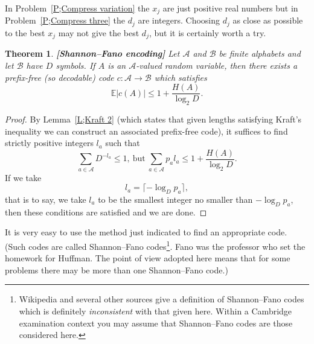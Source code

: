\documentclass[12pt,a4paper]{article}
\theoremstyle{plain}
\newtheorem{theorem}{Theorem}[section]
\theoremstyle{definition}
\begin{document}
In Problem~\ref{P;Compress variation}
the $x_{j}$ are just positive real numbers but in
Problem~\ref{P;Compress three} the $d_{j}$ are integers.
Choosing $d_{j}$ as close as possible to the best $x_{j}$
may not give the best $d_{j}$, but it is certainly worth a try.
\begin{theorem}\label{T;Shannon--Fano}{\bf[Shannon--Fano encoding]} 
Let ${\mathcal A}$ and ${\mathcal B}$
be finite alphabets and let ${\mathcal B}$ have $D$ symbols. If 
$A$ is an ${\mathcal A}$-valued random variable, 
then there exists
a prefix-free (so decodable) code 
$c:{\mathcal A}\rightarrow{\mathcal B}$
which satisfies 
\[{\mathbb E}|c(A)|\leq 1+\frac{H(A)}{\log_{2} D}.\]
\end{theorem}
\begin{proof} By  Lemma~\ref{L;Kraft 2} (which states
that given lengths satisfying
Kraft's inequality we can construct an associated
prefix-free code), it suffices to find strictly
positive integers $l_{a}$ such that
\[\sum_{a\in {\mathcal A}}D^{-l_{a}}\leq 1,
\ \text{but}
\ \sum_{a\in {\mathcal A}}p_{a}l_{a}\leq 1+\frac{H(A)}{\log_{2} D}.\]
If we take
\[l_{a}=\lceil -\log_{D} p_{a}\rceil,\]
that is to say, we take $l_{a}$ to be the smallest integer
no smaller than $-\log_{D} p_{a}$, then these conditions 
are satisfied and we are done.
\end{proof}
It is very easy to use the method just indicated to
find an appropriate code. (Such codes are called Shannon--Fano
codes\footnote{Wikipedia and several other sources give
a definition of Shannon--Fano codes which is 
definitely \emph{inconsistent} with that given here.
Within a Cambridge examination context you may assume
that Shannon--Fano codes are those considered here.}.
Fano was the professor who set the homework for Huffman.
The point of view adopted here means that for some
problems there may be more than one Shannon--Fano
code.)
\end{document}
